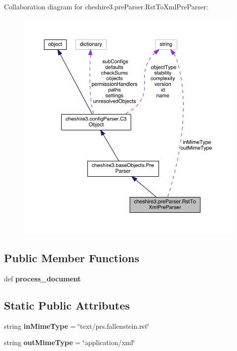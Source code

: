 Collaboration diagram for cheshire3.\-pre\-Parser.\-Rst\-To\-Xml\-Pre\-Parser\-:
\nopagebreak
\begin{figure}[H]
\begin{center}
\leavevmode
\includegraphics[width=350pt]{classcheshire3_1_1pre_parser_1_1_rst_to_xml_pre_parser__coll__graph}
\end{center}
\end{figure}
\subsection*{Public Member Functions}
\begin{DoxyCompactItemize}
\item 
\hypertarget{classcheshire3_1_1pre_parser_1_1_rst_to_xml_pre_parser_ac33bb7d1953c817e620ea88a7820b27d}{def {\bfseries process\-\_\-document}}\label{classcheshire3_1_1pre_parser_1_1_rst_to_xml_pre_parser_ac33bb7d1953c817e620ea88a7820b27d}

\end{DoxyCompactItemize}
\subsection*{Static Public Attributes}
\begin{DoxyCompactItemize}
\item 
\hypertarget{classcheshire3_1_1pre_parser_1_1_rst_to_xml_pre_parser_a36d723fbaeae5f27cfedaaa3fe69d4ae}{string {\bfseries in\-Mime\-Type} = \char`\"{}text/prs.\-fallenstein.\-rst\char`\"{}}\label{classcheshire3_1_1pre_parser_1_1_rst_to_xml_pre_parser_a36d723fbaeae5f27cfedaaa3fe69d4ae}

\item 
\hypertarget{classcheshire3_1_1pre_parser_1_1_rst_to_xml_pre_parser_a557e06a4320bd43d7b11354ec87c7cf6}{string {\bfseries out\-Mime\-Type} = \char`\"{}application/xml\char`\"{}}\label{classcheshire3_1_1pre_parser_1_1_rst_to_xml_pre_parser_a557e06a4320bd43d7b11354ec87c7cf6}

\end{DoxyCompactItemize}
